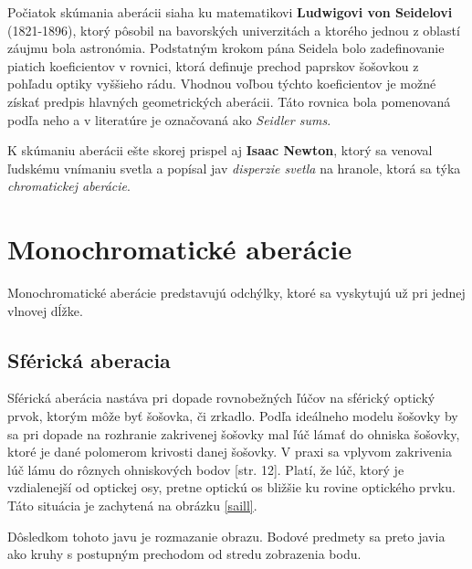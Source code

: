 Počiatok skúmania aberácii siaha ku matematikovi \textbf{Ludwigovi von Seidelovi} (1821-1896), ktorý
pôsobil na bavorských univerzitách a ktorého jednou z oblastí záujmu bola astronómia. \cite{seidel}
Podstatným krokom pána Seidela bolo zadefinovanie piatich koeficientov v rovnici, ktorá definuje
prechod paprskov šošovkou z pohľadu optiky vyššieho rádu. Vhodnou voľbou týchto koeficientov je 
možné získať predpis hlavných geometrických aberácii. Táto rovnica bola pomenovaná podľa neho a 
v literatúre je označovaná ako \textit{Seidler sums}.

K skúmaniu aberácii ešte skorej prispel aj \textbf{Isaac Newton}, ktorý sa venoval ľudskému vnímaniu svetla a
popísal jav \textit{disperzie svetla} na hranole, ktorá sa týka \textit{chromatickej aberácie}. \cite{elert}

\section{Monochromatické aberácie}
Monochromatické aberácie predstavujú odchýlky, ktoré sa vyskytujú už pri jednej vlnovej dĺžke.
\subsection{Sférická aberacia}
Sférická aberácia nastáva pri dopade rovnobežných ľúčov na sférický optický prvok, ktorým môže byť
šošovka, či zrkadlo. 
Podľa ideálneho modelu šošovky by sa pri dopade na rozhranie zakrivenej šošovky mal ľúč lámať do ohniska šošovky, ktoré
je dané polomerom krivosti danej šošovky. V praxi sa vplyvom zakrivenia lúč lámu do rôznych
ohniskových bodov \cite{elisa}[str. 12]. Platí, že lúč, ktorý je vzdialenejší od optickej osy, pretne optickú os bližšie
ku rovine optického prvku. Táto situácia je zachytená na obrázku \ref{saill}.

Dôsledkom tohoto javu je rozmazanie obrazu. Bodové predmety sa preto javia ako kruhy s postupným
prechodom od stredu zobrazenia bodu.

